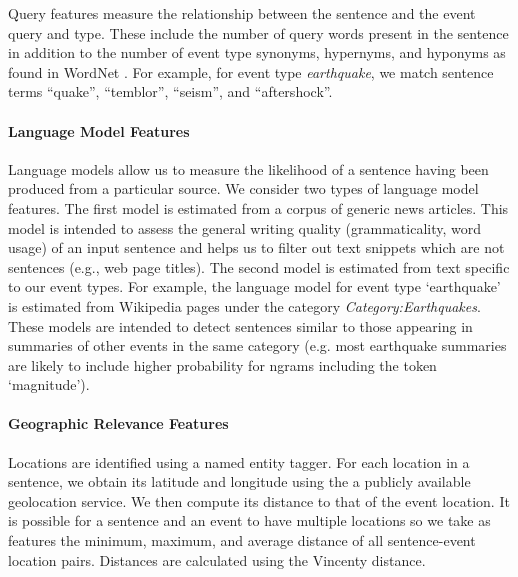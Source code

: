 Query features measure the relationship between the sentence and the event query and type.  These include the number of query words present in the sentence in addition to the number of event type synonyms, hypernyms, and hyponyms as found in WordNet \cite{miller1995wordnet}.  For example, for event type \emph{earthquake},  we match sentence terms ``quake'', ``temblor'', ``seism'', and ``aftershock''.
\paragraph{Language Model Features}\label{subsubsec:lm}
Language models allow us to measure the likelihood of a sentence having been produced from a particular source.  We consider two types of language model features.  The first model is estimated from a corpus of generic news articles.  This model is intended to assess the general writing quality (grammaticality, word usage) of an input sentence and helps us to filter out text snippets which are not sentences (e.g., web page titles).  The second model is estimated from text specific to our event types.  For example, the language model for event type `earthquake' is estimated from Wikipedia pages under the category \emph{Category:Earthquakes}.  These models are intended to detect sentences similar to those appearing in summaries of other events in the same category (e.g. most earthquake summaries are likely to include higher probability for ngrams including the token `magnitude').  



\paragraph{Geographic Relevance Features}

Locations are identified using a named entity tagger. For each location in a sentence, we obtain its latitude and longitude using the a publicly available geolocation service.  We then compute its distance to that of the event location.  It is possible for a sentence and an event to have multiple locations so we take as features the minimum, maximum, and average distance of all sentence-event location pairs.  Distances are calculated using the Vincenty distance. 

